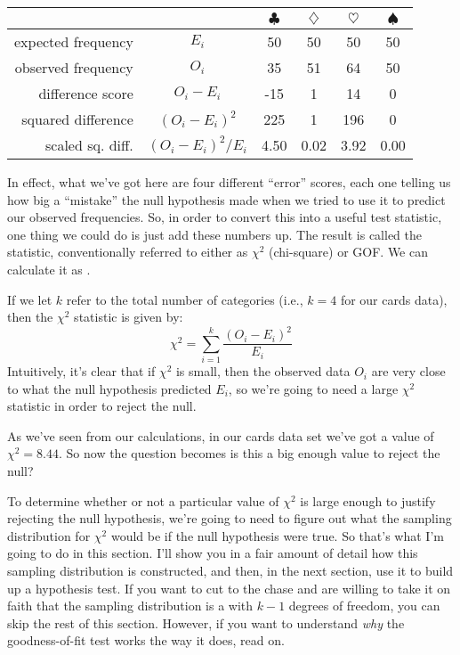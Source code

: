\begin{center}
\begin{tabular}{rc|cccc}
& & $\clubsuit$ & $\diamondsuit$ & $\heartsuit$ & $\spadesuit$ \\ \hline 
expected frequency &$E_i$ & 50 & 50 & 50 & 50 \\ 
observed frequency &$O_i$ & 35 & 51 & 64 & 50 \\ 
  difference score & $O_i - E_i$ & -15 & 1 & 14 & 0 \\
  squared difference & $(O_i-E_i)^2$ & 225 & 1 & 196 & 0\\
  scaled sq. diff. & $(O_i-E_i)^2/E_i$ & 4.50 & 0.02 & 3.92 & 0.00\\
\end{tabular}
\end{center}

In effect, what we've got here are four different ``error'' scores, each one telling us how big a ``mistake'' the null hypothesis made when we tried to use it to predict our observed frequencies. So, in order to convert this into a useful test statistic, one thing we could do is just add these numbers up. The result is called the  statistic, conventionally referred to either as $\chi^2$ (chi-square) or GOF. We can calculate it as .

\vspace{0.5cm}
\begin{mdframed}[style=MyFrame,nobreak=true]
If we let $k$ refer to the total number of categories (i.e., $k=4$ for our cards data), then the $\chi^2$ statistic is given by:
$$
\chi^2 = \sum_{i=1}^k \frac{(O_i - E_i)^2}{E_i}
$$
Intuitively, it's clear that if $\chi^2$ is small, then the observed data $O_i$ are very close to what the null hypothesis predicted $E_i$, so we're going to need a large $\chi^2$ statistic in order to reject the null. 
\end{mdframed}

As we've seen from our calculations, in our cards data set we've got a value of $\chi^2 = 8.44$. So now the question becomes is this a big enough value to reject the null?


To determine whether or not a particular value of $\chi^2$ is large enough to justify rejecting the null hypothesis, we're going to need to figure out what the sampling distribution for $\chi^2$ would be if the null hypothesis were true. So that's what I'm going to do in this section. I'll show you in a fair amount of detail how this sampling distribution is constructed, and then, in the next section, use it to build up a hypothesis test. If you want to cut to the chase and are willing to take it on faith that the sampling distribution is a  with $k-1$ degrees of freedom, you can skip the rest of this section. However, if you want to understand {\it why} the goodness-of-fit test works the way it does, read on.

